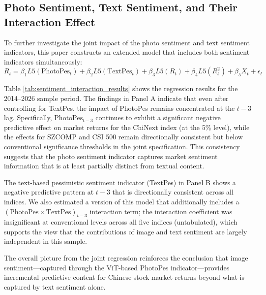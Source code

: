 \documentclass[AER]{AEA}
\begin{document}
\subsection{Photo Sentiment, Text Sentiment, and Their Interaction Effect}
To further investigate the joint impact of the photo sentiment and text sentiment indicators, this paper constructs an extended model that includes both sentiment indicators simultaneously:
\begin{equation}
R_t = \beta_1 L5(\text{PhotoPes}_t) + \beta_2 L5(\text{TextPes}_t) + \beta_3 L5(R_t) + \beta_4 L5(R_t^2) + \beta_5 X_t + \epsilon_t
\end{equation}

Table \ref{tab:sentiment_interaction_results} shows the regression results for the 2014--2026 sample period. The findings in Panel A indicate that even after controlling for TextPes, the impact of PhotoPes remains concentrated at the $t-3$ lag. Specifically, $\text{PhotoPes}_{t-3}$ continues to exhibit a significant negative predictive effect on market returns for the ChiNext index (at the 5\% level), while the effects for SZCOMP and CSI 500 remain directionally consistent but below conventional significance thresholds in the joint specification. This consistency suggests that the photo sentiment indicator captures market sentiment information that is at least partially distinct from textual content.

The text-based pessimistic sentiment indicator (TextPes) in Panel B shows a negative predictive pattern at $t-3$ that is directionally consistent across all indices. We also estimated a version of this model that additionally includes a $(\text{PhotoPes} \times \text{TextPes})_{t-3}$ interaction term; the interaction coefficient was insignificant at conventional levels across all five indices (untabulated), which supports the view that the contributions of image and text sentiment are largely independent in this sample.

The overall picture from the joint regression reinforces the conclusion that image sentiment---captured through the ViT-based PhotoPes indicator---provides incremental predictive content for Chinese stock market returns beyond what is captured by text sentiment alone.
\end{document}
